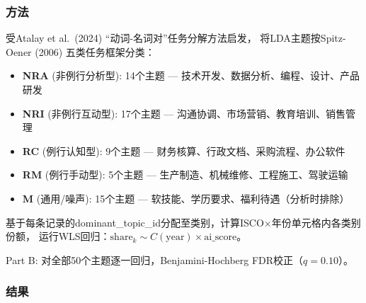 \documentclass[12pt,a4paper]{ctexart}
\begin{document}
\subsubsection{方法}

受Atalay et al.\ (2024) ``动词-名词对''任务分解方法启发，
将LDA主题按Spitz-Oener (2006) 五类任务框架分类：

\begin{itemize}
\item \textbf{NRA} (非例行分析型): 14个主题 — 技术开发、数据分析、编程、设计、产品研发
\item \textbf{NRI} (非例行互动型): 17个主题 — 沟通协调、市场营销、教育培训、销售管理
\item \textbf{RC} (例行认知型): 9个主题 — 财务核算、行政文档、采购流程、办公软件
\item \textbf{RM} (例行手动型): 5个主题 — 生产制造、机械维修、工程施工、驾驶运输
\item \textbf{M} (通用/噪声): 15个主题 — 软技能、学历要求、福利待遇（分析时排除）
\end{itemize}

基于每条记录的dominant\_topic\_id分配至类别，计算ISCO$\times$年份单元格内各类别份额，
运行WLS回归：$\text{share}_k \sim C(\text{year}) \times \text{ai\_score}$。

Part B: 对全部50个主题逐一回归，Benjamini-Hochberg FDR校正（$q=0.10$）。

\subsubsection{结果}
\end{document}
